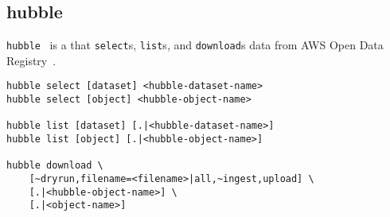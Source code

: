 \subsection{hubble}
\label{hubble}

\texttt{hubble}~ is a  that \texttt{select}s, \texttt{list}s, and \texttt{download}s data from AWS Open Data Registry~. 
%
\begin{verbatim}
hubble select [dataset] <hubble-dataset-name>
hubble select [object] <hubble-object-name>

hubble list [dataset] [.|<hubble-dataset-name>]
hubble list [object] [.|<hubble-object-name>]

hubble download \
    [~dryrun,filename=<filename>|all,~ingest,upload] \
    [.|<hubble-object-name>] \
    [.|<object-name>]
\end{verbatim}
